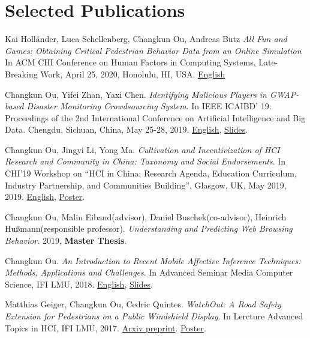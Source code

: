\section{\textbf{Selected Publications}}
 \resumeSubHeadingListStart
    \item{
        Kai Holländer, Luca Schellenberg, Changkun Ou, Andreas Butz
        \emph{All Fun and Games: Obtaining Critical Pedestrian Behavior Data from an Online Simulation}
        In ACM CHI Conference on Human Factors in Computing Systems, Late-Breaking Work, April 25, 2020, Honolulu, HI, USA.
        \href{http://www.medien.ifi.lmu.de/pubdb/publications/pub/hollaender2020chi-lbw/hollaender2020chi-lbw.pdf}{English}
    }
    \item{
        Changkun Ou, Yifei Zhan, Yaxi Chen.
        \emph{Identifying Malicious Players in GWAP-based Disaster Monitoring Crowdsourcing System}. 
        In IEEE ICAIBD' 19: Proceedings of the 2nd International Conference on Artificial Intelligence and Big Data. Chengdu, Sichuan, China, May 25-28, 2019.
        \href{https://github.com/changkun/papers/blob/master/papers/ou2019gwap.pdf}{English},
        \href{https://github.com/changkun/papers/blob/master/papers/ou2019gwap-slides.pdf}{Slides}.
    }
    \item{
        Changkun Ou, Jingyi Li, Yong Ma.
        \emph{Cultivation and Incentivization of HCI Research and Community in China: Taxonomy and Social Endorsements}. 
        In CHI'19 Workshop on ``HCI in China: Research Agenda, Education Curriculum, Industry Partnership, and Communities Building'', Glasgow, UK, May 2019, 2019.
        \href{https://github.com/changkun/papers/blob/master/papers/ou2019chi-paper.pdf}{English},
        \href{https://github.com/changkun/papers/blob/master/papers/ou2019chi-poster.pdf}{Poster}.
    }
    \item{
        Changkun Ou, Malin Eiband(advisor), Daniel Buschek(co-advisor), Heinrich Hußmann(responsible professor).
        \emph{Understanding and Predicting Web Browsing Behavior}. 
        2019, \textbf{Master Thesis}.
    }
    \item{
        Changkun Ou.
        \emph{An Introduction to Recent Mobile Affective Inference Techniques: Methods, Applications and Challenges}.
        In Advanced Seminar Media Computer Science, IFI LMU, 2018. 
        \href{https://github.com/changkun/papers/blob/master/papers/ou2018hs-paper.pdf}{English}, 
        \href{hhttps://github.com/changkun/papers/blob/master/papers/ou2018hs-slides.pdf}{Slides}.
    }
    \item{
        Matthias Geiger, Changkun Ou, Cedric Quintes.
        \emph{WatchOut: A Road Safety Extension for Pedestrians on a Public Windshield Display}.
        In Lercture Advanced Topics in HCI, IFI LMU, 2017. 
        \href{https://arxiv.org/abs/1905.05390}{Arxiv preprint}. 
        \href{https://github.com/changkun/papers/blob/master/papers/ou2017ath-poster.pdf}{Poster}.
    }
